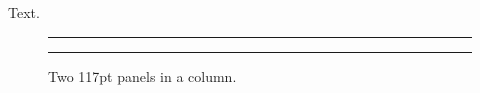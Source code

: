 \documentclass[10pt,twocolumn,letterpaper]{article}
\begin{document}
Text.
\begin{figure}
\centering
\rule{117pt}{1cm}\hspace{4pt}\rule{117pt}{1cm}
\caption{Two 117pt panels in a column.}
\end{figure}
\end{document}
